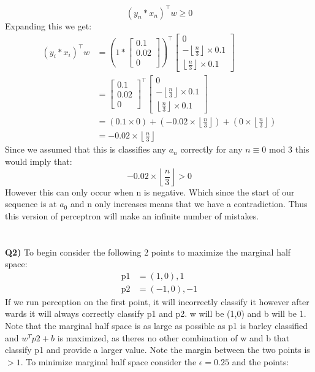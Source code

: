 \documentclass{article}
\begin{document}
\begin{titlepage}
\[ (y_n*x_n)^\top w \geq 0 \]
Expanding this we get:
\begin{align*} 
(y_i*x_i)^\top w &= \left(1*\begin{bmatrix}
0.1\\
0.02\\
0
\end{bmatrix}\right)^\top\begin{bmatrix}
0\\
-\left \lfloor\frac{n}{3}\right \rfloor \times 0.1\\
\left \lfloor\frac{n}{3}\right \rfloor \times 0.1
\end{bmatrix} \\
&=\begin{bmatrix}
0.1\\
0.02\\
0
\end{bmatrix}^\top\begin{bmatrix}
0\\
-\left \lfloor\frac{n}{3}\right \rfloor \times 0.1\\
\left \lfloor\frac{n}{3}\right \rfloor \times 0.1
\end{bmatrix}\\
&= (0.1\times0) + (-0.02 \times \left \lfloor\frac{n}{3}\right \rfloor) + (0 \times \left \lfloor\frac{n}{3}\right \rfloor) \\
&= -0.02 \times \left \lfloor\frac{n}{3}\right \rfloor
\end{align*}
Since we assumed that this is classifies any $a_n$ correctly for any $n \equiv 0\text{  mod 3}$ this would imply that:
\[ -0.02 \times \left \lfloor\frac{n}{3}\right \rfloor > 0 \]
However this can only occur when n is negative. Which since the start of our sequence is at $a_0$ and n only increases means that we have a contradiction. Thus this version of perceptron will make an infinite number of mistakes. \\\\\\
\textbf{Q2)} To begin consider the following 2 points to maximize the marginal half space: 
\begin{align*} 
\text{p1} &= (1,0),1 \\
\text{p2} &= (-1,0),-1
\end{align*}
If we run perception on the first point, it will incorrectly classify it however after wards it will always correctly classify p1 and p2. w will be (1,0) and b will be 1. Note that the marginal half space is as large as possible  as p1 is barley classified and $w^Tp2 + b$ is maximized, as theres no other combination of w and b that classify p1 and provide a larger value. Note the margin between the two points is $> 1$. To minimize marginal half space consider the $\epsilon = 0.25$ and the points:

\end{titlepage}
\end{document}
